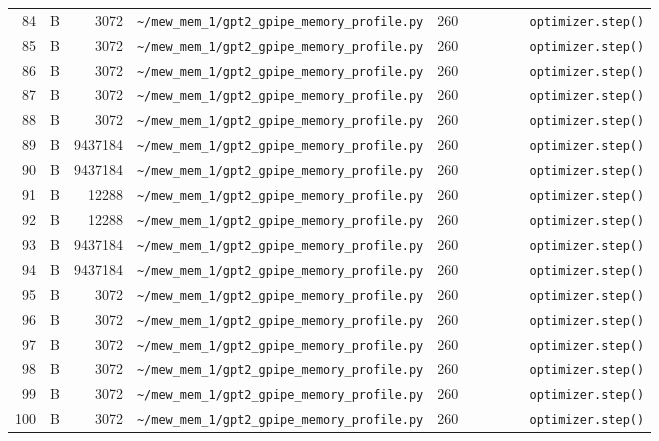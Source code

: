 \documentclass{article}
\begin{document}
\begin{longtable}{r l r p{6.5cm} r p{7.0cm}}
84 & B & 3072 & \lstinline|~/mew_mem_1/gpt2_gpipe_memory_profile.py| & 260 & \lstinline|        optimizer.step()| \\
85 & B & 3072 & \lstinline|~/mew_mem_1/gpt2_gpipe_memory_profile.py| & 260 & \lstinline|        optimizer.step()| \\
86 & B & 3072 & \lstinline|~/mew_mem_1/gpt2_gpipe_memory_profile.py| & 260 & \lstinline|        optimizer.step()| \\
87 & B & 3072 & \lstinline|~/mew_mem_1/gpt2_gpipe_memory_profile.py| & 260 & \lstinline|        optimizer.step()| \\
88 & B & 3072 & \lstinline|~/mew_mem_1/gpt2_gpipe_memory_profile.py| & 260 & \lstinline|        optimizer.step()| \\
89 & B & 9437184 & \lstinline|~/mew_mem_1/gpt2_gpipe_memory_profile.py| & 260 & \lstinline|        optimizer.step()| \\
90 & B & 9437184 & \lstinline|~/mew_mem_1/gpt2_gpipe_memory_profile.py| & 260 & \lstinline|        optimizer.step()| \\
91 & B & 12288 & \lstinline|~/mew_mem_1/gpt2_gpipe_memory_profile.py| & 260 & \lstinline|        optimizer.step()| \\
92 & B & 12288 & \lstinline|~/mew_mem_1/gpt2_gpipe_memory_profile.py| & 260 & \lstinline|        optimizer.step()| \\
93 & B & 9437184 & \lstinline|~/mew_mem_1/gpt2_gpipe_memory_profile.py| & 260 & \lstinline|        optimizer.step()| \\
94 & B & 9437184 & \lstinline|~/mew_mem_1/gpt2_gpipe_memory_profile.py| & 260 & \lstinline|        optimizer.step()| \\
95 & B & 3072 & \lstinline|~/mew_mem_1/gpt2_gpipe_memory_profile.py| & 260 & \lstinline|        optimizer.step()| \\
96 & B & 3072 & \lstinline|~/mew_mem_1/gpt2_gpipe_memory_profile.py| & 260 & \lstinline|        optimizer.step()| \\
97 & B & 3072 & \lstinline|~/mew_mem_1/gpt2_gpipe_memory_profile.py| & 260 & \lstinline|        optimizer.step()| \\
98 & B & 3072 & \lstinline|~/mew_mem_1/gpt2_gpipe_memory_profile.py| & 260 & \lstinline|        optimizer.step()| \\
99 & B & 3072 & \lstinline|~/mew_mem_1/gpt2_gpipe_memory_profile.py| & 260 & \lstinline|        optimizer.step()| \\
100 & B & 3072 & \lstinline|~/mew_mem_1/gpt2_gpipe_memory_profile.py| & 260 & \lstinline|        optimizer.step()| \\

\end{longtable}
\end{document}
